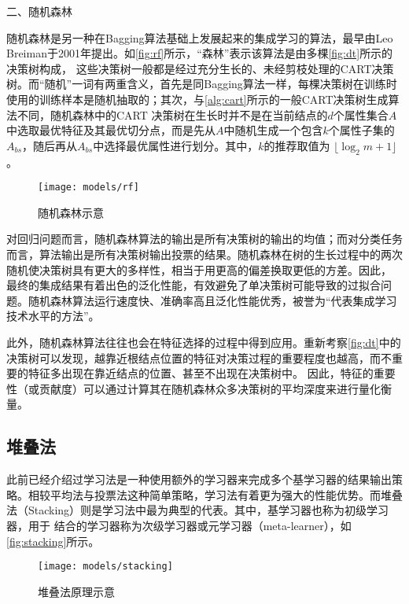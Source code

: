 二、随机森林

随机森林是另一种在Bagging算法基础上发展起来的集成学习的算法，最早由Leo Breiman于2001年提出\cite{breiman2001}。如\autoref{fig:rf}所示，“森林”表示该算法是由多棵\autoref{fig:dt}所示的决策树构成，
这些决策树一般都是经过充分生长的、未经剪枝处理的CART决策树。而“随机”一词有两重含义，首先是同Bagging算法一样，每棵决策树在训练时使用的训练样本是随机抽取的；其次，与\autoref{alg:cart}所示的一般CART决策树生成算法不同，随机森林中的CART
决策树在生长时并不是在当前结点的$d$个属性集合$A$中选取最优特征及其最优切分点，而是先从$A$中随机生成一个包含$k$个属性子集的$A_{bs}$，随后再从$A_{bs}$中选择最优属性进行划分\cite{Zhou2016,Liu2018,breiman2001}。其中，$k$的推荐取值为
$\lfloor \log_2m + 1 \rfloor$\cite{breiman2001}。

\begin{figure}[htbp]
    \centering
    \texttt{[image: models/rf]}
    \caption{\label{fig:rf}随机森林示意}
\end{figure}

对回归问题而言，随机森林算法的输出是所有决策树的输出的均值；而对分类任务而言，算法输出是所有决策树输出投票的结果。随机森林在树的生长过程中的两次随机使决策树具有更大的多样性，相当于用更高的偏差换取更低的方差。因此，
最终的集成结果有着出色的泛化性能，有效避免了单决策树可能导致的过拟合问题。随机森林算法运行速度快、准确率高且泛化性能优秀，被誉为“代表集成学习技术水平的方法”\cite{Zhou2016,Liu2018}。

此外，随机森林算法往往也会在特征选择的过程中得到应用\cite{Aurélien2018}。重新考察\autoref{fig:dt}中的决策树可以发现，越靠近根结点位置的特征对决策过程的重要程度也越高，而不重要的特征多出现在靠近结点的位置、甚至不出现在决策树中。
因此，特征的重要性（或贡献度）可以通过计算其在随机森林众多决策树的平均深度来进行量化衡量。

\subsection{堆叠法}
此前已经介绍过学习法是一种使用额外的学习器来完成多个基学习器的结果输出策略。相较平均法与投票法这种简单策略，学习法有着更为强大的性能优势。而堆叠法（Stacking）则是学习法中最为典型的代表。其中，基学习器也称为初级学习器，用于
结合的学习器称为次级学习器或元学习器（meta-learner），如\autoref{fig:stacking}所示。

\begin{figure}[htbp]
    \centering
    \texttt{[image: models/stacking]}
    \caption{\label{fig:stacking}堆叠法原理示意}
\end{figure}

